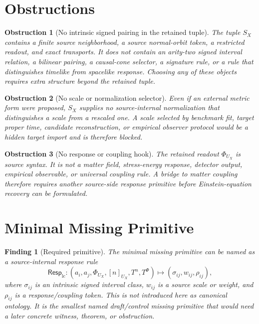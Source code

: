 \documentclass[11pt]{article}
\newcommand{\RespLC}{\mathsf{Resp}_{\mathrm{lc}}}
\newtheorem{finding}{Finding}
\newtheorem{obstruction}{Obstruction}
\begin{document}
\section{Obstructions}

\begin{obstruction}[No intrinsic signed pairing in the retained tuple]
The tuple \(S_X\) contains a finite source neighborhood, a source
normal-orbit token, a restricted readout, and exact transports. It
does not contain an arity-two signed interval relation, a bilinear
pairing, a causal-cone selector, a signature rule, or a rule that
distinguishes timelike from spacelike response. Choosing any of these
objects requires extra structure beyond the retained tuple.
\end{obstruction}

\begin{obstruction}[No scale or normalization selector]
Even if an external metric form were proposed, \(S_X\) supplies no
source-internal normalization that distinguishes a scale from a
rescaled one. A scale selected by benchmark fit, target proper time,
candidate reconstruction, or empirical observer protocol would be a
hidden target import and is therefore blocked.
\end{obstruction}

\begin{obstruction}[No response or coupling hook]
The retained readout \(\Phi_{U_X}\) is source syntax. It is not a
matter field, stress-energy response, detector output, empirical
observable, or universal coupling rule. A bridge to matter coupling
therefore requires another source-side response primitive before
Einstein-equation recovery can be formulated.
\end{obstruction}

\section{Minimal Missing Primitive}

\begin{finding}[Required primitive]
The minimal missing primitive can be named as a source-internal
response rule
\[
    \RespLC:
    (a_i,a_j,\Phi_{U_X},[n]_{U_X},T^n,T^\Phi)
    \longmapsto
    (\sigma_{ij},w_{ij},\rho_{ij}),
\]
where \(\sigma_{ij}\) is an intrinsic signed interval class,
\(w_{ij}\) is a source scale or weight, and \(\rho_{ij}\) is a
response/coupling token. This is not introduced here as canonical
ontology. It is the smallest named draft/control missing primitive
that would need a later concrete witness, theorem, or obstruction.
\end{finding}
\end{document}
